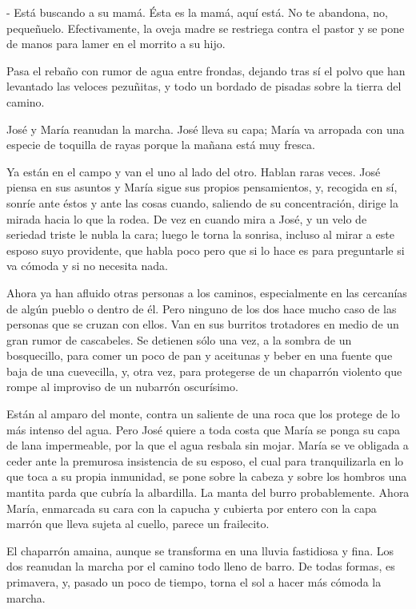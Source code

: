 \documentclass[12pt]{book} %
\begin{document}
- Está buscando a su mamá. Ésta es la mamá, aquí está. No te abandona, no, pequeñuelo. Efectivamente, la oveja madre se restriega contra el pastor y se pone de manos para lamer en el morrito a su hijo. 

Pasa el rebaño con rumor de agua entre frondas, dejando tras sí el polvo que han levantado las veloces pezuñitas, y todo un bordado de pisadas sobre la tierra del camino. 

José y María reanudan la marcha. José lleva su capa; María va arropada con una especie de toquilla de rayas porque la mañana está muy fresca. 

Ya están en el campo y van el uno al lado del otro. Hablan raras veces. José piensa en sus asuntos y María sigue sus propios pensamientos, y, recogida en sí, sonríe ante éstos y ante las cosas cuando, saliendo de su concentración, dirige la mirada hacia lo que la rodea. De vez en cuando mira a José, y un velo de seriedad triste le nubla la cara; luego le torna la sonrisa, incluso al mirar a este esposo suyo providente, que habla poco pero que si lo hace es para preguntarle si va cómoda y si no necesita nada. 

Ahora ya han afluido otras personas a los caminos, especialmente en las cercanías de algún pueblo o dentro de él. Pero ninguno de los dos hace mucho caso de las personas que se cruzan con ellos. Van en sus burritos trotadores en medio de un gran rumor de cascabeles. Se detienen sólo una vez, a la sombra de un bosquecillo, para comer un poco de pan y aceitunas y beber en una fuente que baja de una cuevecilla, y, otra vez, para protegerse de un chaparrón violento que rompe al improviso de un nubarrón oscurísimo. 

Están al amparo del monte, contra un saliente de una roca que los protege de lo más intenso del agua. Pero José quiere a toda costa que María se ponga su capa de lana impermeable, por la que el agua resbala sin mojar. María se ve obligada a ceder ante la premurosa insistencia de su esposo, el cual para tranquilizarla en lo que toca a su propia inmunidad, se pone sobre la cabeza y sobre los hombros una mantita parda que cubría la albardilla. La manta del burro probablemente. Ahora María, enmarcada su cara con la capucha y cubierta por entero con la capa marrón que lleva sujeta al cuello, parece un frailecito. 

El chaparrón amaina, aunque se transforma en una lluvia fastidiosa y fina. Los dos reanudan la marcha por el camino todo lleno de barro. De todas formas, es primavera, y, pasado un poco de tiempo, torna el sol a hacer más cómoda la marcha. 
\end{document}
